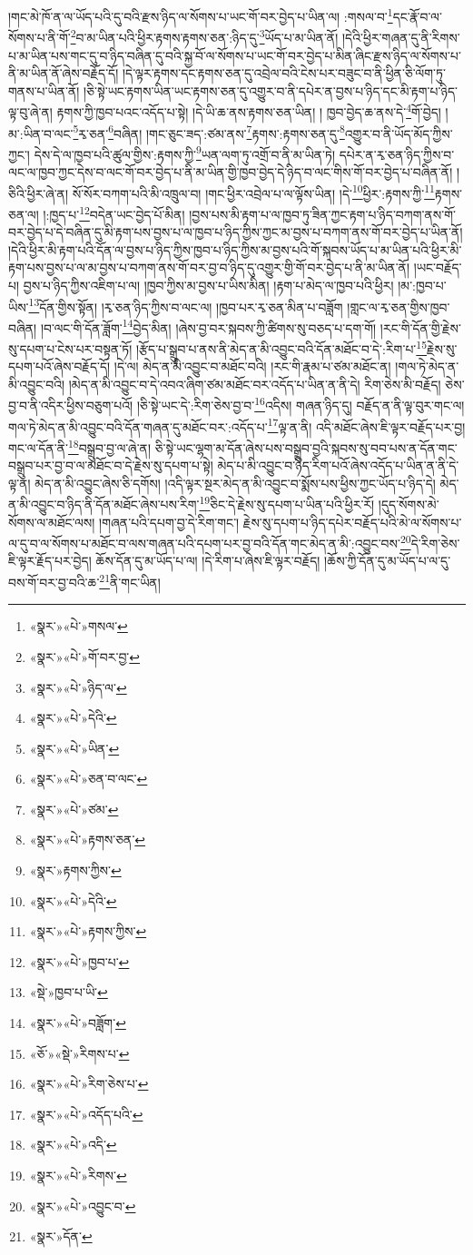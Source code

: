 །གང་མེ་ཁོ་ན་ལ་ཡོད་པའི་དུ་བའི་རྫས་ཉིད་ལ་སོགས་པ་ཡང་གོ་བར་བྱེད་པ་ཡིན་ལ། :གསལ་བ་\footnote{«སྣར་»«པེ་»གསལ་}དང་རྣོ་བ་ལ་སོགས་པ་ནི་གོ་\footnote{«སྣར་»«པེ་»གོ་བར་བྱ་}བ་མ་ཡིན་པའི་ཕྱིར་རྟགས་རྟགས་ཅན་:ཉིད་དུ་\footnote{«སྣར་»«པེ་»ཉིད་ལ་}ཡོད་པ་མ་ཡིན་ནོ། །དེའི་ཕྱིར་གཞན་དུ་ནི་རིགས་པ་མ་ཡིན་པས་གང་དུ་བ་ཉིད་བཞིན་དུ་བའི་སྐྱ་བོ་ལ་སོགས་པ་ཡང་གོ་བར་བྱེད་པ་མིན་ཞིང་རྫས་ཉིད་ལ་སོགས་པ་ནི་མ་ཡིན་ནོ་ཞེས་བརྗོད་དོ། །དེ་ལྟར་རྟགས་དང་རྟགས་ཅན་དུ་འབྲེལ་བའི་ངེས་པར་བཟུང་བ་ནི་ཕྱིན་ཅི་ལོག་ཏུ་གནས་པ་ཡིན་ནོ། །ཅི་སྟེ་ཡང་རྟགས་ཡིན་ཡང་རྟགས་ཅན་དུ་འགྱུར་བ་ནི་དཔེར་ན་བྱས་པ་ཉིད་དང་མི་རྟག་པ་ཉིད་ལྟ་བུ་ཞེ་ན། རྟགས་ཀྱི་ཁྱབ་པའང་འདོད་པ་སྟེ། །དེ་ཡི་ཆ་ནས་རྟགས་ཅན་ཡིན། །
ཁྱབ་བྱེད་ཆ་ནས་དེ་\footnote{«སྣར་»«པེ་»དེའི་}གོ་བྱེད། །མ་:ཡིན་བ་ལང་\footnote{«སྣར་»«པེ་»ཡིན་}རྭ་ཅན་\footnote{«སྣར་»«པེ་»ཅན་བ་ལང་}བཞིན། །གང་ཅུང་ཟད་:ཙམ་ནས་\footnote{«སྣར་»«པེ་»ཙམ་}རྟགས་:རྟགས་ཅན་དུ་\footnote{«སྣར་»«པེ་»རྟགས་ཅན་}འགྱུར་བ་ནི་ཡོད་མོད་ཀྱིས་ཀྱང་། དེས་དེ་ལ་ཁྱབ་པའི་ཚུལ་གྱིས་:རྟགས་ཀྱི་\footnote{«སྣར་»རྟགས་ཀྱིས་}ཡན་ལག་ཏུ་འགྲོ་བ་ནི་མ་ཡིན་ཏེ། དཔེར་ན་རྭ་ཅན་ཉིད་ཀྱིས་བ་ལང་ལ་ཁྱབ་ཀྱང་དེས་བ་ལང་གོ་བར་བྱེད་པ་ནི་མ་ཡིན་གྱི་ཁྱབ་བྱེད་དེ་ཉིད་བ་ལང་གིས་གོ་བར་བྱེད་པ་བཞིན་ནོ། །ཅིའི་ཕྱིར་ཞེ་ན། སོ་སོར་བཀག་པའི་མི་འཁྲུལ་བ། །གང་ཕྱིར་འབྲེལ་པ་ལ་ལྟོས་ཡིན། །དེ་\footnote{«སྣར་»«པེ་»དེའི་}ཕྱིར་:རྟགས་ཀྱི་\footnote{«སྣར་»«པེ་»རྟགས་ཀྱིས་}རྟགས་ཅན་ལ། །:ཁྱད་པ་\footnote{«སྣར་»«པེ་»ཁྱབ་པ་}བདེན་ཡང་བྱེད་པོ་མིན། །བྱས་པས་མི་རྟག་པ་ལ་ཁྱབ་ཏུ་ཟིན་ཀྱང་རྟག་པ་ཉིད་བཀག་ནས་གོ་བར་བྱེད་པ་དེ་བཞིན་དུ་མི་རྟག་པས་བྱས་པ་ལ་ཁྱབ་པ་ཉིད་ཀྱིས་ཀྱང་མ་བྱས་པ་བཀག་ནས་གོ་བར་བྱེད་པ་ཡིན་ནོ། །དེའི་ཕྱིར་མི་རྟག་པའི་དོན་ལ་བྱས་པ་ཉིད་ཀྱིས་ཁྱབ་པ་ཉིད་ཀྱིས་མ་བྱས་པའི་གོ་སྐབས་ཡོད་པ་མ་ཡིན་པའི་ཕྱིར་མི་རྟག་པས་བྱས་པ་ལ་མ་བྱས་པ་བཀག་ནས་གོ་བར་བྱ་བ་ཉིད་དུ་འགྱུར་གྱི་གོ་བར་བྱེད་པ་ནི་མ་ཡིན་ནོ། །ཡང་བརྗོད་པ། བྱས་པ་ཉིད་ཀྱིས་འཇིག་པ་ལ། །ཁྱབ་ཀྱིས་མ་བྱས་པ་ཡིས་མིན། །རྟག་པ་མེད་ལ་ཁྱབ་པའི་ཕྱིར། །མ་:ཁྱབ་པ་ཡིས་\footnote{«སྡེ་»ཁྱབ་པ་ཡི་}དོན་གྱིས་སྟོན། །རྭ་ཅན་ཉིད་ཀྱིས་བ་ལང་ལ། །ཁྱབ་པར་རྭ་ཅན་མིན་པ་བཟློག །གླང་ལ་རྭ་ཅན་གྱིས་ཁྱབ་བཞིན། །བ་ལང་གི་དོན་ཟློག་\footnote{«སྣར་»«པེ་»བཟློག་}བྱེད་མིན། །ཞེས་བྱ་བར་སྐབས་ཀྱི་ཚིགས་སུ་བཅད་པ་དག་གོ། །རང་གི་དོན་གྱི་རྗེས་སུ་དཔག་པ་ངེས་པར་བསྟན་ཏོ། །རྩོད་པ་སྒྲུབ་པ་ནས་ནི་མེད་ན་མི་འབྱུང་བའི་དོན་མཐོང་བ་དེ་:རིག་པ་\footnote{«ཅོ་»«སྡེ་»རིགས་པ་}རྗེས་སུ་དཔག་པའོ་ཞེས་བརྗོད་དོ། །དེ་ལ། མེད་ན་མི་འབྱུང་བ་མཐོང་བའི། །རང་གི་རྣམ་པ་ཙམ་མཐོང་ན། །གལ་ཏེ་མེད་ན་མི་འབྱུང་བའི། །མེད་ན་མི་འབྱུང་བ་དེ་འབའ་ཞིག་ཙམ་མཐོང་བར་འདོད་པ་ཡིན་ན་ནི་དེ། རིག་ཅེས་མི་བརྗོད། ཅེས་བྱ་བ་ནི་འདིར་ཕྱིས་བཅུག་པའོ། །ཅི་སྟེ་ཡང་དེ་:རིག་ཅེས་བྱ་བ་\footnote{«སྣར་»«པེ་»རིག་ཅེས་པ་}འདིས། གཞན་ཉིད་དུ། བརྗོད་ན་ནི་ལྟ་བུར་གང་ལ། གལ་ཏེ་མེད་ན་མི་འབྱུང་བའི་དོན་གཞན་དུ་མཐོང་བར་:འདོད་པ་\footnote{«སྣར་»«པེ་»འདོད་པའི་}ལྟ་ན་ནི། འདི་མཐོང་ཞེས་ཇི་ལྟར་བརྗོད་པར་བྱ། གང་ལ་དོན་ནི་\footnote{«སྣར་»«པེ་»འདི་}བསྒྲུབ་བྱ་ལ་ཞེ་ན། ཅི་སྟེ་ཡང་ལྷག་མ་དོན་ཞེས་པས་བསྒྲུབ་བྱའི་སྐབས་སུ་བབ་པས་ན་དོན་གང་བསྒྲུབ་པར་བྱ་བ་ལ་མཐོང་བ་དེ་རྗེས་སུ་དཔག་པ་སྟེ། མེད་པ་མི་འབྱུང་བ་ཉིད་རིག་པའོ་ཞེས་འདོད་པ་ཡིན་ན་ནི་དེ་ལྟ་ན། མེད་ན་མི་འབྱུང་ཞེས་ཅི་དགོས། །འདི་ལྟར་སྔར་མེད་ན་མི་འབྱུང་བ་སྨོས་པས་ཕྱིས་ཀྱང་ཡོད་པ་ཉིད་དེ། མེད་ན་མི་འབྱུང་བ་ཉིད་ནི་དོན་མཐོང་ཞེས་པས་རིག་\footnote{«སྣར་»«པེ་»རིགས་}ཅིང་དེ་རྗེས་སུ་དཔག་པ་ཡིན་པའི་ཕྱིར་རོ། །དུད་སོགས་མེ་སོགས་ལ་མཐོང་ལས། །གཞན་པའི་དཔག་བྱ་དེ་རིག་གང་། རྗེས་སུ་དཔག་པ་ཉིད་དཔེར་བརྗོད་པའི་མེ་ལ་སོགས་པ་ལ་དུ་བ་ལ་སོགས་པ་མཐོང་བ་ལས་གཞན་པའི་དཔག་པར་བྱ་བའི་དོན་གང་མེད་ན་མི་:འབྱུང་བས་\footnote{«སྣར་»«པེ་»འབྱུང་བ་}དེ་རིག་ཅེས་ཇི་ལྟར་རྗོད་པར་བྱེད། ཆོས་དོན་དུ་མ་ཡོད་པ་ལ། །དེ་རིག་པ་ཞེས་ཇི་ལྟར་བརྗོད། །ཆོས་ཀྱི་དོན་དུ་མ་ཡོད་པ་ལ་དུ་བས་གོ་བར་བྱ་བའི་ཆ་\footnote{«སྣར་»དོན་}ནི་གང་ཡིན། 